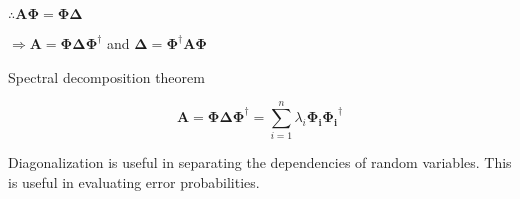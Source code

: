 \documentclass[fleqn]{article}
\begin{document}
	$\therefore \mathbf{A\Phi} = \mathbf{\Phi\Delta}$
	
	$\Rightarrow \mathbf{A} = \mathbf{\Phi\Delta}\mathbf{\Phi}^{\dag}$ and $\mathbf{\Delta} = \mathbf{\Phi}^{\dag}\mathbf{A\Phi}$
	
	Spectral decomposition theorem
	
	\begin{equation*}
		\mathbf{A} = \mathbf{\Phi\Delta}\mathbf{\Phi}^{\dag} = \sum_{i=1}^{n}\lambda_i\mathbf{\Phi_i}\mathbf{\Phi_i}^{\dag}
	\end{equation*}
	
	Diagonalization is useful in separating the dependencies of random variables. This is useful in evaluating error probabilities.
\end{document}
